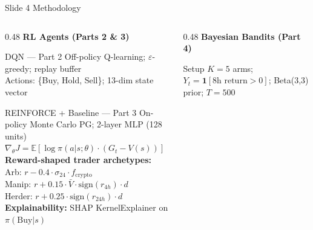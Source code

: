 \documentclass[aspectratio=169, 10pt]{beamer}
\begin{document}
\begin{frame}[t]{Slide 4 \quad Methodology}
\vspace{2pt}
\begin{columns}[T]

  \begin{column}{0.48\textwidth}
    \textbf{\small RL Agents (Parts 2 \& 3)}
    \vspace{2pt}

    \begin{block}{\small DQN --- Part 2}
    \vspace{1pt}
    \footnotesize Off-policy Q-learning; $\varepsilon$-greedy; replay buffer\\
    Actions: \{Buy, Hold, Sell\}; 13-dim state vector
    \vspace{1pt}
    \end{block}

    \vspace{3pt}
    \begin{block}{\small REINFORCE + Baseline --- Part 3}
    \vspace{1pt}
    \footnotesize
    On-policy Monte Carlo PG; 2-layer MLP (128 units)\\
    $\nabla_\theta J = \mathbb{E}[\log\pi(a|s;\theta)\cdot(G_t - V(s))]$\\[2pt]
    \textbf{Reward-shaped trader archetypes:}\\
    \textcolor{accentblue}{Arb:} $r - 0.4\cdot\sigma_{24}\cdot f_\text{crypto}$\\
    \textcolor{cornellred}{Manip:} $r + 0.15\cdot\bar{V}\cdot\text{sign}(r_{4h})\cdot d$\\
    \textcolor{accentgreen}{Herder:} $r + 0.25\cdot\text{sign}(r_{24h})\cdot d$\\[2pt]
    \textbf{Explainability:} SHAP KernelExplainer on $\pi(\text{Buy}|s)$
    \vspace{1pt}
    \end{block}
  \end{column}

  \begin{column}{0.48\textwidth}
    \textbf{\small Bayesian Bandits (Part 4)}
    \vspace{2pt}

    \begin{block}{\small Setup}
    \vspace{1pt}
    \footnotesize
    $K=5$ arms; $Y_t=\mathbf{1}[\text{8h return}>0]$; Beta(3,3) prior; $T=500$
    \vspace{1pt}
    \end{block}


\end{column}
\end{columns}
\end{frame}
\end{document}
